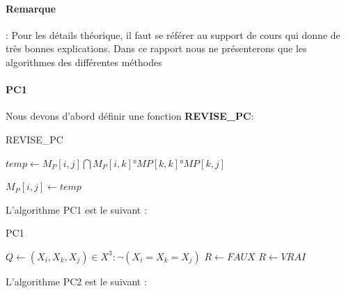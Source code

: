 \documentclass[12pt]{report}
\begin{document}
	\paragraph{Remarque}: 
	Pour les détails théorique, il faut se référer au support de cours qui donne de très bonnes explications. Dans ce rapport
	nous ne présenterons que les algorithmes des différentes méthodes
	
	\paragraph{PC1}
	Nous devons d'abord définir une fonction \textbf{REVISE\_PC}: \\
	
	\begin{algorithm}[H]
		\caption{REVISE\_PC}
		
		
		
		\Begin
		{
			$temp \gets M_P[i,j]\bigcap M_P[i,k]°MP[k,k]°MP[k,j]$\;
			{
				$M_P[i,j] \gets temp$
				
			}
			{
			}
			
		}
	\end{algorithm}
	
	\par 
	L'algorithme PC1 est le suivant : 
	
	\begin{algorithm}[H]
		\caption{PC1}
		
		
		$Q \gets {(X_i,X_k,X_j)\in X^3 : \lnot (X_i=X_k=X_j)}$\;
		{
			$R \gets FAUX$\;
			{
				{
					$R \gets VRAI$\;	
				}
			}
		}
		\;
	\end{algorithm}
	
		
	\par 
	L'algorithme PC2 est le suivant : 
	
\end{document}
